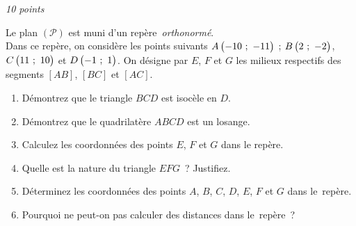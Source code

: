 \documentclass[a4paper,12pt,twocolumn,landscape]{article}
\begin{document}
\vspace*{1em}

\begin{minipage}{0.45\textwidth}
\thispagestyle{firststyle}

\vspace*{1em}

%


\exercice\hfill \emph{10 points}

Le plan $\left(\mathscr{P}\right)$ est muni d'un repère~\emph{orthonormé}.\\ Dans ce repère, on considère les points suivants $A\begin{pmatrix}-10~;~-11\end{pmatrix}$ ; $B\begin{pmatrix}2~;~-2\end{pmatrix}$, $C\begin{pmatrix}11~;~10\end{pmatrix}$ et $D\begin{pmatrix}-1~;~1\end{pmatrix}$.
On désigne par $E$, $F$ et $G$ les milieux respectifs des segments $\left[AB\right]$,  $\left[BC\right]$ et $\left[AC\right]$.

\begin{enumerate}
	\item Démontrez que le triangle $BCD$ est isocèle en $D$.
	\item Démontrez que le quadrilatère $ABCD$ est un losange.
	\item Calculez les coordonnées des points $E$, $F$ et $G$ dans le repère.
	\item Quelle est la nature du triangle $EFG$~? Justifiez.
	\item Déterminez les coordonnées des points $A$, $B$, $C$, $D$, $E$, $F$ et $G$ dans le~repère.
	\item Pourquoi ne peut-on pas calculer des distances dans le~repère~?
\end{enumerate}


\end{minipage}
\end{document}
